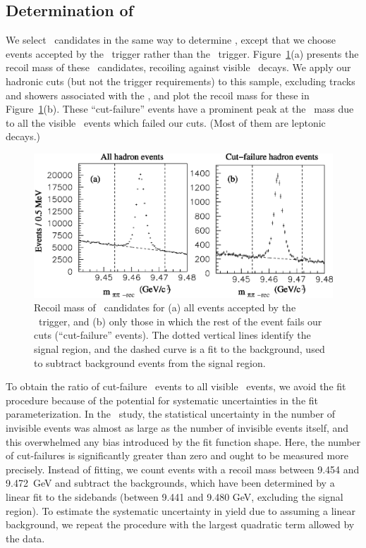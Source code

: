 \documentclass{cornell}
\begin{document}
\subsection{Determination of \boldmath \ecuts}

We select \pipi\ candidates in the same way to determine \ecuts,
except that we choose events accepted by the \hadron\ trigger rather
than the \twotrack\ trigger.  Figure~\ref{pipihadron}(a) presents the
recoil mass of these \pipi\ candidates, recoiling against visible \us\
decays.  We apply our hadronic cuts (but not the trigger requirements)
to this sample, excluding tracks and showers associated with the
\pipi, and plot the recoil mass for these in Figure~\ref{pipihadron}(b).  These ``cut-failure'' events have a prominent
peak at the \us\ mass due to all the visible \us\ events which failed
our cuts.  (Most of them are leptonic decays.)

\begin{figure}[p]
  \begin{center}
    \includegraphics[width=\linewidth]{pipihadron}
  \end{center}
  \caption[\pipi\ recoil mass for events from the \hadron\
  trigger]{\label{pipihadron} Recoil mass of \pipi\ candidates for (a)
  all events accepted by the \hadron\ trigger, and (b) only those in
  which the rest of the event fails our cuts (``cut-failure'' events).
  The dotted vertical lines identify the signal region, and the dashed
  curve is a fit to the background, used to subtract background events
  from the signal region.}
\end{figure}

To obtain the ratio of cut-failure \us\ events to all visible \us\
events, we avoid the fit procedure because of the potential for
systematic uncertainties in the fit parameterization.  In the \evis\
study, the statistical uncertainty in the number of invisible events
was almost as large as the number of invisible events itself, and this
overwhelmed any bias introduced by the fit function shape.  Here, the
number of cut-failures is significantly greater than zero and ought to
be measured more precisely.  Instead of fitting, we count events with
a recoil mass between 9.454 and 9.472~GeV and subtract the 
backgrounds, which have been determined by a linear fit to the sidebands
(between 9.441 and 9.480 GeV, excluding the signal region).  To
estimate the systematic uncertainty in yield due to assuming a linear
background, we repeat the procedure with the largest quadratic term
allowed by the data.
\end{document}
